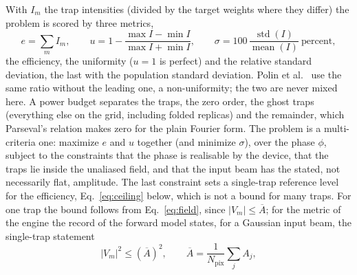 With $I_m$ the trap intensities (divided by the target weights where they differ) the problem is scored by three metrics,
\begin{equation}
e=\sum_mI_m,\qquad u=1-\frac{\max I-\min I}{\max I+\min I},\qquad \sigma=100\,\frac{\operatorname{std}(I)}{\operatorname{mean}(I)}\ \text{percent},
\label{eq:metrics}
\end{equation}
the efficiency, the uniformity ($u=1$ is perfect) and the relative standard deviation, the last with the population standard deviation. Polin et al.~\cite{polin} use the same ratio without the leading one, a non-uniformity; the two are never mixed here. A power budget separates the traps, the zero order, the ghost traps (everything else on the grid, including folded replicas) and the remainder, which Parseval's relation makes zero for the plain Fourier form. The problem is a multi-criteria one: maximize $e$ and $u$ together (and minimize $\sigma$), over the phase $\phi$, subject to the constraints that the phase is realisable by the device, that the traps lie inside the unaliased field, and that the input beam has the stated, not necessarily flat, amplitude. The last constraint sets a single-trap reference level for the efficiency, Eq.~\eqref{eq:ceiling} below, which is not a bound for many traps. For one trap the bound follows from Eq.~\eqref{eq:field}, since $|V_m|\le\overline A$; for the metric of the engine the record of the forward model states, for a Gaussian input beam, the single-trap statement
\begin{equation}
|V_m|^2\le(\overline A)^2,\qquad \overline A=\frac1{N_{\mathrm{pix}}}\sum_jA_j,
\label{eq:ceiling}
\end{equation}
